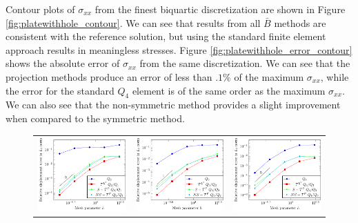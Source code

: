     {Contour plots of  $\sigma_{xx}$ from the finest biquartic discretization are shown in Figure \ref{fig:platewithhole_contour}. We can see that results from all $\bar{B}$ methods are consistent with the reference solution, but using the standard finite element approach results in meaningless stresses. Figure \ref{fig:platewithhole_error_contour} shows the absolute error of $\sigma_{xx}$ from the same discretization. We can see that the projection methods produce an error of less than $.1\%$ of the maximum $\sigma_{xx}$, while the error for the standard $Q_4$ element is of the same order as the maximum $\sigma_{xx}$. We can also see that the non-symmetric method provides a slight improvement when compared to the symmetric method.}
\begin{figure}[h]
    \center
    \begin{tabular}{ccc}
        \includegraphics[width=.31\linewidth]{deformation_p_2} & \includegraphics[width=.31\linewidth]{deformation_p_3} & \includegraphics[width=.31\linewidth]{deformation_p_4} \\

\end{tabular}
\end{figure}
